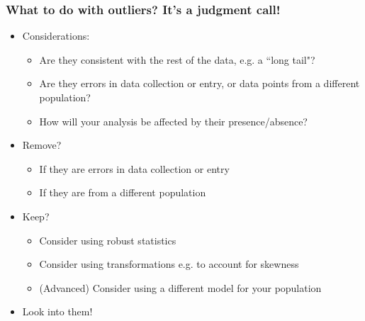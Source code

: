 \documentclass[slidestop,compress,mathserif]{beamer}
\begin{document}

\begin{frame}
\frametitle{What to do with outliers? It's a judgment call!}
\begin{itemize}
  \item Considerations:
  \begin{itemize}
    \item Are they consistent with the rest of the data, e.g. a ``long tail"?
    \item Are they errors in data collection or entry, or data points from a different population?
    \item How will your analysis be affected by their presence/absence?
  \end{itemize}
  \item Remove?
  \begin{itemize}
    \item If they are errors in data collection or entry
    \item If they are from a different population
  \end{itemize}
  \item Keep?
  \begin{itemize}
    \item Consider using robust statistics
    \item Consider using transformations e.g. to account for skewness
    \item (Advanced) Consider using a different model for your population
  \end{itemize}
  \item Look into them!
\end{itemize}
\end{frame}
\end{document}
